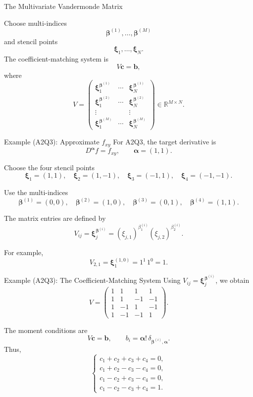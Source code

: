 \documentclass{beamer}
\begin{document}
\begin{frame}{The Multivariate Vandermonde Matrix}

Choose multi-indices
\[
\boldsymbol{\beta}^{(1)},\ldots,\boldsymbol{\beta}^{(M)}
\]
and stencil points
\[
\boldsymbol{\xi}_1,\ldots,\boldsymbol{\xi}_N.
\]
The coefficient-matching system is
\[
V\boldsymbol{c}=\boldsymbol{b},
\]
where
\[
V=
\begin{pmatrix}
\boldsymbol{\xi}_1^{\boldsymbol{\beta}^{(1)}}&
\cdots&
\boldsymbol{\xi}_N^{\boldsymbol{\beta}^{(1)}}\\
\boldsymbol{\xi}_1^{\boldsymbol{\beta}^{(2)}}&
\cdots&
\boldsymbol{\xi}_N^{\boldsymbol{\beta}^{(2)}}\\
\vdots&&\vdots\\
\boldsymbol{\xi}_1^{\boldsymbol{\beta}^{(M)}}&
\cdots&
\boldsymbol{\xi}_N^{\boldsymbol{\beta}^{(M)}}
\end{pmatrix}
\in\mathbb{R}^{M\times N}.
\]
\end{frame}

\begin{frame}{Example (A2Q3): Approximate $f_{xy}$}
For A2Q3, the target derivative is
\[
D^{\boldsymbol{\alpha}}f=f_{xy},
\qquad
\boldsymbol{\alpha}=(1,1).
\]

Choose the four stencil points
\[
\boldsymbol{\xi}_1=(1,1),\quad
\boldsymbol{\xi}_2=(1,-1),\quad
\boldsymbol{\xi}_3=(-1,1),\quad
\boldsymbol{\xi}_4=(-1,-1).
\]

Use the multi-indices
\[
\boldsymbol{\beta}^{(1)}=(0,0),\quad
\boldsymbol{\beta}^{(2)}=(1,0),\quad
\boldsymbol{\beta}^{(3)}=(0,1),\quad
\boldsymbol{\beta}^{(4)}=(1,1).
\]

The matrix entries are defined by
\[
V_{ij}
=
\boldsymbol{\xi}_j^{\boldsymbol{\beta}^{(i)}}
=
(\xi_{j,1})^{\beta^{(i)}_1}
(\xi_{j,2})^{\beta^{(i)}_2}.
\]

For example,
\[
V_{2,1}
=
\boldsymbol{\xi}_1^{(1,0)}
=
1^1\,1^0=1.
\]
\end{frame}

\begin{frame}{Example (A2Q3): The Coefficient-Matching System}
Using $V_{ij}
=
\boldsymbol{\xi}_j^{\boldsymbol{\beta}^{(i)}}$, we obtain
\[
V=
\begin{pmatrix}
1&1&1&1\\
1&1&-1&-1\\
1&-1&1&-1\\
1&-1&-1&1
\end{pmatrix}.
\]

The moment conditions are
\[
V\boldsymbol{c}=\boldsymbol{b},
\qquad
b_i
=
\boldsymbol{\alpha}!\,
\delta_{\boldsymbol{\beta}^{(i)},\boldsymbol{\alpha}}.
\]
Thus,
\[
\begin{cases}
c_1+c_2+c_3+c_4=0,\\
c_1+c_2-c_3-c_4=0,\\
c_1-c_2+c_3-c_4=0,\\
c_1-c_2-c_3+c_4=1.
\end{cases}
\]
\end{frame}
\end{document}
